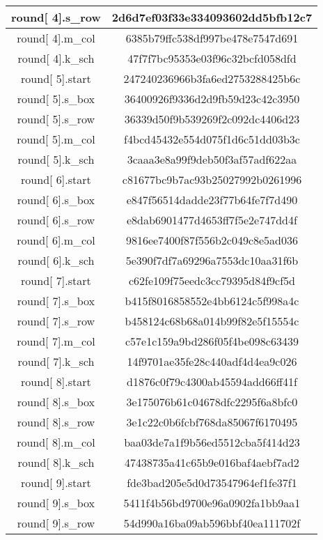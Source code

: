 \begin{center}
\begin{longtable}{ |c|c| }
\hline
round[ 4].s\_row  & 2d6d7ef03f33e334093602dd5bfb12c7\\
\hline
round[ 4].m\_col  & 6385b79ffc538df997be478e7547d691\\
\hline
round[ 4].k\_sch  & 47f7f7bc95353e03f96c32bcfd058dfd\\
\hline
round[ 5].start  & 247240236966b3fa6ed2753288425b6c\\
\hline
round[ 5].s\_box  & 36400926f9336d2d9fb59d23c42c3950\\
\hline
round[ 5].s\_row  & 36339d50f9b539269f2c092dc4406d23\\
\hline
round[ 5].m\_col  & f4bcd45432e554d075f1d6c51dd03b3c\\
\hline
round[ 5].k\_sch  & 3caaa3e8a99f9deb50f3af57adf622aa\\
\hline
round[ 6].start  & c81677bc9b7ac93b25027992b0261996\\
\hline
round[ 6].s\_box  & e847f56514dadde23f77b64fe7f7d490\\
\hline
round[ 6].s\_row  & e8dab6901477d4653ff7f5e2e747dd4f\\
\hline
round[ 6].m\_col  & 9816ee7400f87f556b2c049c8e5ad036\\
\hline
round[ 6].k\_sch  & 5e390f7df7a69296a7553dc10aa31f6b\\
\hline
round[ 7].start  & c62fe109f75eedc3cc79395d84f9cf5d\\
\hline
round[ 7].s\_box  & b415f8016858552e4bb6124c5f998a4c\\
\hline
round[ 7].s\_row  & b458124c68b68a014b99f82e5f15554c\\
\hline
round[ 7].m\_col  & c57e1c159a9bd286f05f4be098c63439\\
\hline
round[ 7].k\_sch  & 14f9701ae35fe28c440adf4d4ea9c026\\
\hline
round[ 8].start  & d1876c0f79c4300ab45594add66ff41f\\
\hline
round[ 8].s\_box  & 3e175076b61c04678dfc2295f6a8bfc0\\
\hline
round[ 8].s\_row  & 3e1c22c0b6fcbf768da85067f6170495\\
\hline
round[ 8].m\_col  & baa03de7a1f9b56ed5512cba5f414d23\\
\hline
round[ 8].k\_sch  & 47438735a41c65b9e016baf4aebf7ad2\\
\hline
round[ 9].start  & fde3bad205e5d0d73547964ef1fe37f1\\
\hline
round[ 9].s\_box  & 5411f4b56bd9700e96a0902fa1bb9aa1\\
\hline
round[ 9].s\_row  & 54d990a16ba09ab596bbf40ea111702f\\

\end{longtable}
\end{center}
